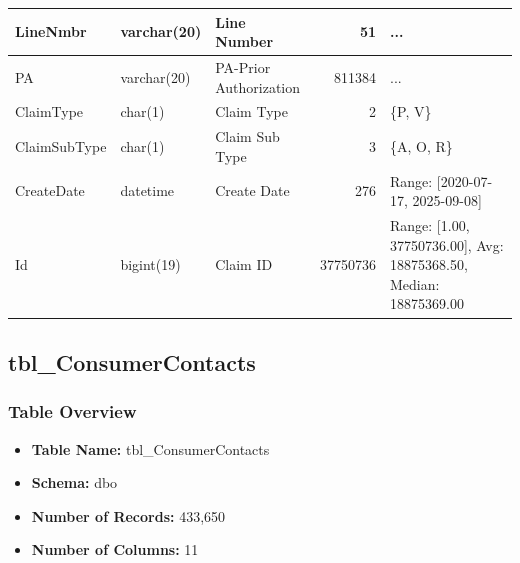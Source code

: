 \begin{landscape}
\begin{longtable}{|l|l|l|r|p{6cm}|}
\hline
LineNmbr & varchar(20) & Line Number & 51 & ... \\
\hline
PA & varchar(20) & PA-Prior Authorization & 811384 & ... \\
\hline
ClaimType & char(1) & Claim Type & 2 & \{P, V\} \\
\hline
ClaimSubType & char(1) & Claim Sub Type & 3 & \{A, O, R\} \\
\hline
CreateDate & datetime & Create Date & 276 & Range: [2020-07-17, 2025-09-08] \\
\hline
Id & bigint(19) & Claim ID & 37750736 & Range: [1.00, 37750736.00], Avg: 18875368.50, Median: 18875369.00 \\
\hline
\end{longtable}

\subsection{tbl\_ConsumerContacts}

\subsubsection{Table Overview}
\begin{itemize}
\item \textbf{Table Name:} tbl\_ConsumerContacts
\item \textbf{Schema:} dbo
\item \textbf{Number of Records:} 433,650
\item \textbf{Number of Columns:} 11
\end{itemize}


\end{landscape}
